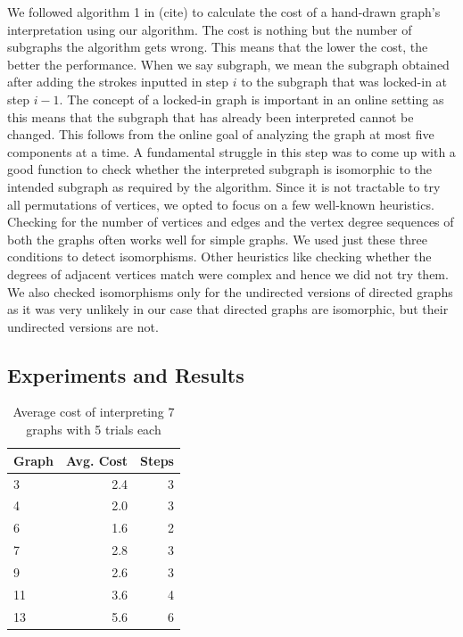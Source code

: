 We followed algorithm 1 in (cite) to calculate the cost of a hand-drawn graph's interpretation using our algorithm. The cost is nothing but the number of subgraphs the algorithm gets wrong. This means that the lower the cost, the better the performance. When we say subgraph, we mean the subgraph obtained after adding the strokes inputted in step $i$ to the subgraph that was locked-in at step $i-1$. The concept of a locked-in graph is important in an online setting as this means that the subgraph that has already been interpreted cannot be changed. This follows from the online goal of analyzing the graph at most five components at a time. A fundamental struggle in this step was to come up with a good function to check whether the interpreted subgraph is isomorphic to the intended subgraph as required by the algorithm. Since it is not tractable to try all permutations of vertices, we opted to focus on a few well-known heuristics. Checking for the number of vertices and edges and the vertex degree sequences of both the graphs often works well for simple graphs. We used just these three conditions to detect isomorphisms. Other heuristics like checking whether the degrees of adjacent vertices match were complex and hence we did not try them. We also checked isomorphisms only for the undirected versions of directed graphs as it was very unlikely in our case that directed graphs are isomorphic, but their undirected versions are not.

\subsection{Experiments and Results}

\begin{table}[!htb] %
    \centering
    \begin{tabular}{lrr}
    \toprule
       Graph & Avg. Cost & Steps \\ %
         \midrule
3  & 2.4 & 3  \\ 
4 & 2.0 & 3 \\
6 & 1.6 & 2 \\
7 & 2.8 & 3 \\
9 & 2.6 & 3 \\
11 & 3.6 & 4 \\
13 & 5.6 & 6 \\
         \bottomrule
    \end{tabular}
    \caption{Average cost of interpreting 7 graphs with 5 trials each}
    \label{tab:table_cost}
\end{table}

